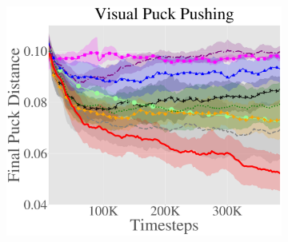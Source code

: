 \begin{figure}[ht!]
{  \medskip

  \begin{subfigure}[t]{.49\linewidth}
    \centering
          \includegraphics[width=\linewidth]{skewfit/figures/plots/main_sawyer_fig_with_hazan/pusher.pdf}
  \end{subfigure}
  \hfill
  \begin{subfigure}[t]{.48\linewidth}
    \centering
\end{subfigure}}
\end{figure}
